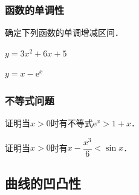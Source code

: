 \documentclass[14pt,notheorems,leqno,xcolor={rgb}]{beamer} %
\begin{document}
\begin{oframe}
\frametitle{函数的单调性}
\begin{exercise}
确定下列函数的单调增减区间．
\begin{enumhalf}
  \item $y=3x^2+6x+5$ ~
  \item $y=x-\mathrm{e}^x$ ~
\end{enumhalf}
\end{exercise}
\end{oframe}


\begin{frame}
\frametitle{不等式问题}
\begin{example}
证明当$x>0$时有不等式$\mathrm{e}^x>1+x$．
\end{example}
\pause
\begin{example}
证明当$x>0$时有$x-\dfrac{x^3}{6}<\sin x$．
\end{example}
\end{frame}


\subsection{曲线的凹凸性}

\end{document}

